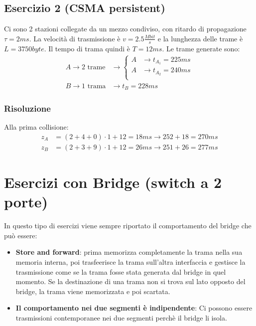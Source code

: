 \documentclass[a4paper]{article}
\begin{document}
\subsection{Esercizio 2 (CSMA persistent)}
Ci sono 2 stazioni collegate da un mezzo condiviso, con ritardo di propagazione
\( \tau = 2ms \). La velocità di trasmissione è \( v = 2.5 \frac{Mbit}{s} \) e la lunghezza
delle trame è \( L = 3750byte \). Il tempo di trama quindi è \( T = 12ms \). Le
trame generate sono:
\[
\begin{aligned}
  A \to 2 \text{ trame} &\to
  \begin{cases}
    A &\to t_{A_1} = 225ms\\
    A &\to t_{A_2} = 240ms\\
  \end{cases}\\
  B \to 1 \text{ trama} &\to t_B = 228ms
\end{aligned}
\]
\label{10-12-esD2}

\subsubsection{Risoluzione}
Alla prima collisione:
\[
  \begin{aligned}
    z_A &= (2+4+0) \cdot 1 + 12 = 18ms \to 252 + 18 = 270ms\\
    z_B &= (2+3+9) \cdot 1 + 12 = 26ms \to 251 + 26 = 277ms
  \end{aligned}
\]

\section{Esercizi con Bridge (switch a 2 porte)}
In questo tipo di esercizi viene sempre riportato il comportamento del bridge che
può essere:
\begin{itemize}
  \item \textbf{Store and forward}: prima memorizza completamente la trama nella sua memoria
    interna, poi trasfeerisce la trama sull'altra interfaccia e gestisce la trasmissione
    come se la trama fosse stata generata dal bridge in quel momento. Se la destinazione
    di una trama non si trova sul lato opposto del bridge, la trama viene memorizzata
    e poi scartata.
  \item \textbf{Il comportamento nei due segmenti è indipendente}: Ci possono essere
    trasmissioni contemporanee nei due segmenti perchè il bridge li isola.
\end{itemize}
\end{document}
